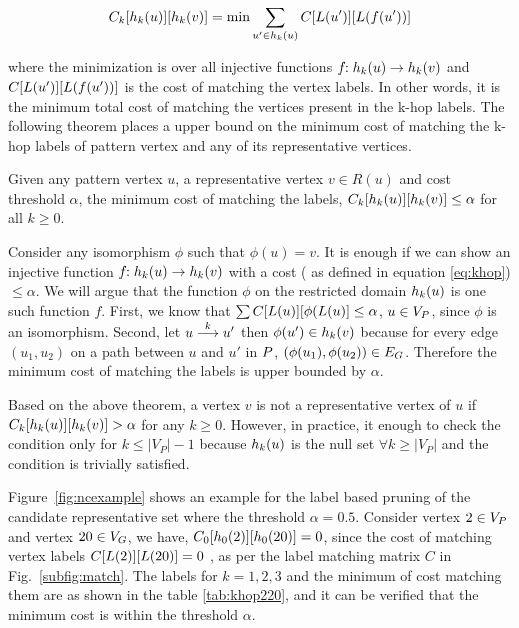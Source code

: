  \begin{equation} \label{eq:khop} \khopcost{k}{u}{v} =
     \text{min}\displaystyle\sum_{u' \in \khopl{k}{u}}
     \matij{C}{L(u')}{L(f(u'))} \end{equation}

 where the minimization is over all injective functions $f\!\!:\khopl{k}{u}
 \rightarrow \khopl{k}{v}$ and $\matij{C}{L(u')}{L(f(u'))}$ is the cost of
 matching the vertex labels.  In other words, it is the minimum total cost of
 matching the vertices present in the k-hop labels.  The following theorem
 places a upper bound on the minimum cost of matching the k-hop labels of
 pattern vertex and any of its representative vertices.


\begin{thm} Given any pattern vertex $u$, a representative vertex $v \in R(u)$
    and cost threshold $\alpha$, the minimum cost of matching the \khop labels,
    $\khopcost{k}{u}{v} \leq \alpha$ for all $k \geq 0$.

\begin{myproof} Consider any isomorphism $\phi$ such that $\phi(u) = v$. It is
    enough if we can show an injective function $f\!\!:\khopl{k}{u} \rightarrow
    \khopl{k}{v}$ with a cost ( as defined in equation \ref{eq:khop}) $\leq
    \alpha$. We will argue that the function $\phi$ on the restricted domain
    $\khopl{k}{u}$ is one such function $f$.  First, we know that
    $\sum\matij{C}{L(u)}{\phi(L(u)} \leq \alpha$, $u \in \vp$, since $\phi$ is
    an isomorphism. Second, let $\kpath{u}{u'}{k}$ then $\phi(u') \in
    \khopl{k}{v}$ because for every edge $(u_1, u_2)$ on a path between $u$ and
    $u'$ in $\pat$, $(\phi(u_1),\phi(u_2)) \in \eg$.  Therefore the minimum cost
    of matching the \khop labels is upper bounded by $\alpha$.  \end{myproof}
    \label{thm:khop} \end{thm}

Based on the above theorem, a vertex $v$ is not a representative vertex of $u$
if $\khopcost{k}{u}{v} > \alpha$ for any $k \geq 0$. However, in practice, it
enough to check the condition only for $k \leq |V_P|-1$ because $\khopl{k}{u}$
is the null set $\forall k \geq |V_P|$ and the condition is trivially satisfied.

Figure~\ref{fig:ncexample} shows an example for the \khop label based pruning of
the candidate representative set where the threshold $\alpha = 0.5$. Consider
vertex $2 \in \vp$ and vertex $20 \in \vg$, we have, $\khopcost{0}{2}{20} = 0$,
since the cost of matching vertex labels $\matij{C}{L(2)}{L(20)} = 0$ , as per
the label matching matrix $C$ in Fig.~\ref{subfig:match}. The \khop labels for
$k=1,2,3$ and the minimum of cost matching them are as shown in the table
\ref{tab:khop220}, and it can be verified that the minimum cost is within the
threshold $\alpha$.

